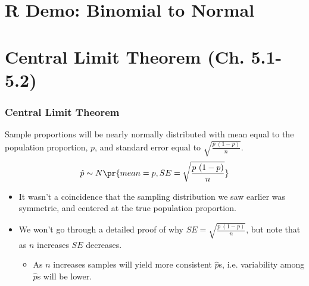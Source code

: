 \documentclass[t,compress,mathserif]{beamer}
\begin{document}
\section{R Demo: Binomial to Normal}


\section{Central Limit Theorem (Ch. 5.1-5.2)}


\begin{frame}
\frametitle{Central Limit Theorem}

{Sample proportions will be nearly normally distributed with mean equal to the population proportion, $p$, and standard error equal to $\sqrt{\frac{p~(1-p)}{n}}$.
\[ \hat{p} \sim N \pr{ mean = p, SE = \sqrt{\frac{p~(1-p)}{n}} } \]
}

\begin{itemize}

\item It wasn't a coincidence that the sampling distribution we saw earlier was symmetric, and centered at the true population proportion.

\item We won't go through a detailed proof of why $SE =  \sqrt{\frac{p~(1-p)}{n}}$, but note that as $n$ increases $SE$ decreases.
\begin{itemize}
\item As $n$ increases samples will yield more consistent $\hat{p}$s, i.e. variability among $\hat{p}$s will be lower.
\end{itemize}

\end{itemize}

\end{frame}

\end{document}
